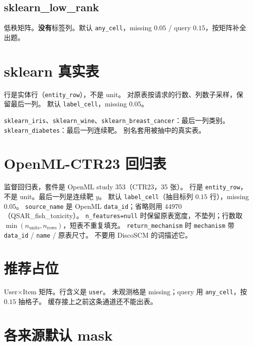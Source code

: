 \documentclass[11pt,a4paper,fontset=none]{ctexart}
\begin{document}
\subsection{sklearn\_low\_rank}
低秩矩阵。\textbf{没有}标签列。默认 \texttt{any\_cell}，missing $0.05$ / query $0.15$，按矩阵补全出题。

\section{sklearn 真实表}
\label{app:skreal}

行是实体行（\texttt{entity\_row}），不是 unit。
对原表按请求的行数、列数子采样，保留最后一列。
默认 \texttt{label\_cell}，missing $0.05$。

\texttt{sklearn\_iris}、\texttt{sklearn\_wine}、\texttt{sklearn\_breast\_cancer}：最后一列类别。
\texttt{sklearn\_diabetes}：最后一列连续靶。
别名套用被抽中的真实表。

\section{OpenML-CTR23 回归表}
\label{app:openml}

监督回归表，套件是 OpenML study 353（CTR23，35 张）。
行是 \texttt{entity\_row}，不是 unit。最后一列是连续靶 $y$。
默认 \texttt{label\_cell}（抽目标列 $0.15$ 行），missing $0.05$。
\texttt{source\_name} 是 OpenML \texttt{data\_id}；省略则用 $44970$（QSAR\_fish\_toxicity）。
\texttt{n\_features=null} 时保留原表宽度，不垫列；行数取 $\min(n_{\mathrm{units}},n_{\mathrm{rows}})$，短表不重复填充。
\texttt{return\_mechanism} 时 \texttt{mechanism} 带 \texttt{data\_id} / \texttt{name} / 原表尺寸。
不要用 DiscoSCM 的词描述它。

\section{推荐占位}
\label{app:recsys}

User$\times$Item 矩阵。行含义是 \texttt{user}。
未观测格是 missing；query 用 \texttt{any\_cell}，按 $0.15$ 抽格子。
缓存接上之前这条通道还不能出表。

\section{各来源默认 mask}
\label{app:masks}
\end{document}
